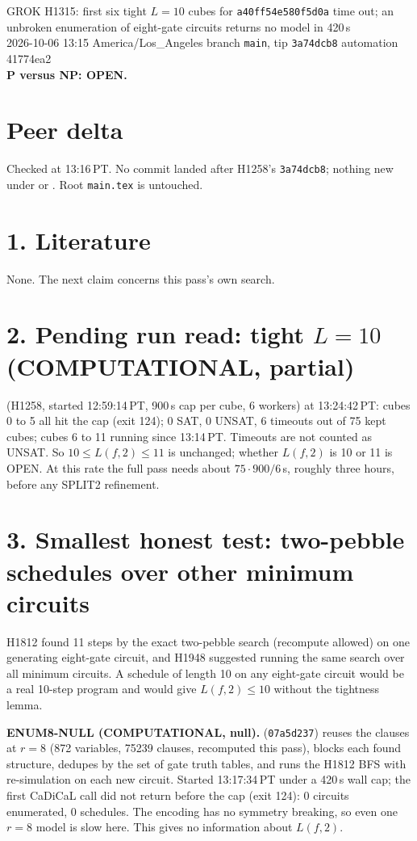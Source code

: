 \documentclass[11pt]{article}
\begin{document}
\sloppy
\begin{center}
{\Large GROK H1315: first six tight $L=10$ cubes for \texttt{a40ff54e580f5d0a} time out; an unbroken enumeration of eight-gate circuits returns no model in 420\,s}\\[4pt]
2026-10-06 13:15 America/Los\_Angeles \quad branch \texttt{main}, tip \texttt{3a74dcb8} \quad automation 41774ea2\\[2pt]
\textbf{P versus NP: OPEN.}
\end{center}

\section*{Peer delta}
Checked at 13:16\,PT. No commit landed after H1258's \texttt{3a74dcb8}; nothing new under  or . Root \texttt{main.tex} is untouched.

\section*{1. Literature}
None. The next claim concerns this pass's own search.

\section*{2. Pending run read: tight $L=10$ (COMPUTATIONAL, partial)}
 (H1258, started 12:59:14\,PT, 900\,s cap per cube, 6 workers) at 13:24:42\,PT: cubes 0 to 5 all hit the cap (exit 124); 0 SAT, 0 UNSAT, 6 timeouts out of 75 kept cubes; cubes 6 to 11 running since 13:14\,PT. Timeouts are not counted as UNSAT. So $10\le L(f,2)\le 11$ is unchanged; whether $L(f,2)$ is 10 or 11 is OPEN. At this rate the full pass needs about $75\cdot 900/6$\,s, roughly three hours, before any SPLIT2 refinement.

\section*{3. Smallest honest test: two-pebble schedules over other minimum circuits}
H1812 found 11 steps by the exact two-pebble search (recompute allowed) on one generating eight-gate circuit, and H1948 suggested running the same search over all minimum circuits. A schedule of length 10 on any eight-gate circuit would be a real 10-step program and would give $L(f,2)\le 10$ without the tightness lemma.

\textbf{ENUM8-NULL (COMPUTATIONAL, null).}  (\texttt{07a5d237}) reuses the  clauses at $r=8$ (872 variables, 75239 clauses, recomputed this pass), blocks each found structure, dedupes by the set of gate truth tables, and runs the H1812 BFS with re-simulation on each new circuit. Started 13:17:34\,PT under a 420\,s wall cap; the first CaDiCaL call did not return before the cap (exit 124): 0 circuits enumerated, 0 schedules. The encoding has no symmetry breaking, so even one $r=8$ model is slow here. This gives no information about $L(f,2)$.
\end{document}
